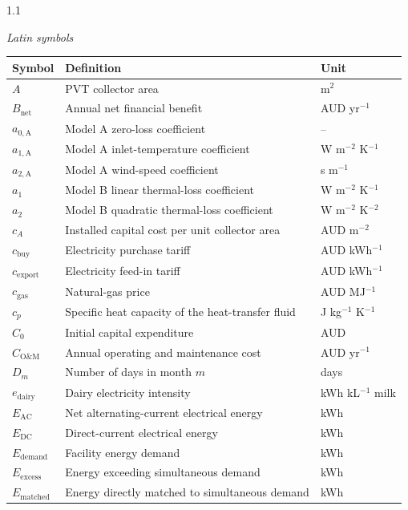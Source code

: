 \documentclass[12pt,letterpaper]{article}
\newcommand{\referenceheading}[1]{\vspace{1.55em}\textit{#1}\par\vspace{0.45em}}
\begin{document}
\begin{spacing}{1.1}
\footnotesize

\referenceheading{Latin symbols}
\begin{longtable}{@{}p{2.0cm} p{9.6cm} p{2.3cm}@{}}
\toprule
\textbf{Symbol} & \textbf{Definition} & \textbf{Unit} \\
\midrule
\endhead
$A$ & PVT collector area & m$^2$ \\
$B_{\mathrm{net}}$ & Annual net financial benefit & AUD yr$^{-1}$ \\
$a_{0,\mathrm{A}}$ & Model A zero-loss coefficient & -- \\
$a_{1,\mathrm{A}}$ & Model A inlet-temperature coefficient & W m$^{-2}$ K$^{-1}$ \\
$a_{2,\mathrm{A}}$ & Model A wind-speed coefficient & s m$^{-1}$ \\
$a_1$ & Model B linear thermal-loss coefficient & W m$^{-2}$ K$^{-1}$ \\
$a_2$ & Model B quadratic thermal-loss coefficient & W m$^{-2}$ K$^{-2}$ \\
$c_A$ & Installed capital cost per unit collector area & AUD m$^{-2}$ \\
$c_{\mathrm{buy}}$ & Electricity purchase tariff & AUD kWh$^{-1}$ \\
$c_{\mathrm{export}}$ & Electricity feed-in tariff & AUD kWh$^{-1}$ \\
$c_{\mathrm{gas}}$ & Natural-gas price & AUD MJ$^{-1}$ \\
$c_p$ & Specific heat capacity of the heat-transfer fluid & J kg$^{-1}$ K$^{-1}$ \\
$C_0$ & Initial capital expenditure & AUD \\
$C_{\mathrm{O\&M}}$ & Annual operating and maintenance cost & AUD yr$^{-1}$ \\
$D_m$ & Number of days in month $m$ & days \\
$e_{\mathrm{dairy}}$ & Dairy electricity intensity & kWh kL$^{-1}$ milk \\
$E_{\mathrm{AC}}$ & Net alternating-current electrical energy & kWh \\
$E_{\mathrm{DC}}$ & Direct-current electrical energy & kWh \\
$E_{\mathrm{demand}}$ & Facility energy demand & kWh \\
$E_{\mathrm{excess}}$ & Energy exceeding simultaneous demand & kWh \\
$E_{\mathrm{matched}}$ & Energy directly matched to simultaneous demand & kWh \\

\end{longtable}
\end{spacing}
\end{document}
